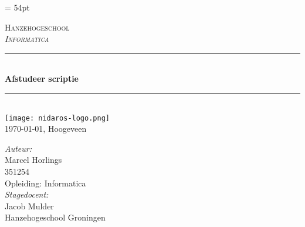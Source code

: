 \documentclass[a4paper,11pt,oneside]{report}
\begin{document}

\pagestyle{fancy}
\renewcommand{\headrulewidth}{0.0pt}
\headheight = 54pt
 







\begin{titlepage}
\oddsidemargin 1cm

\newcommand{\HRule}{\rule{\linewidth}{0.5mm}} %

\center %

\textsc{\LARGE Hanzehogeschool}\\[1.0cm] %

\textsc{\large \textit{Informatica} }\\[0.5cm] %


\HRule \\[0.4cm]
{ \huge \bfseries Afstudeer scriptie}\\[0.4cm] %
\HRule \\[6cm]



\texttt{[image: nidaros-logo.png]}\\
\today, Hoogeveen
\end{titlepage}

\large
\emph{Auteur:}\\
Marcel Horlings\\
 \textsc{351254} \\
Opleiding: Informatica \\



\emph{Stagedocent:}\\
Jacob Mulder\\
Hanzehogeschool Groningen \\
\end{document}
